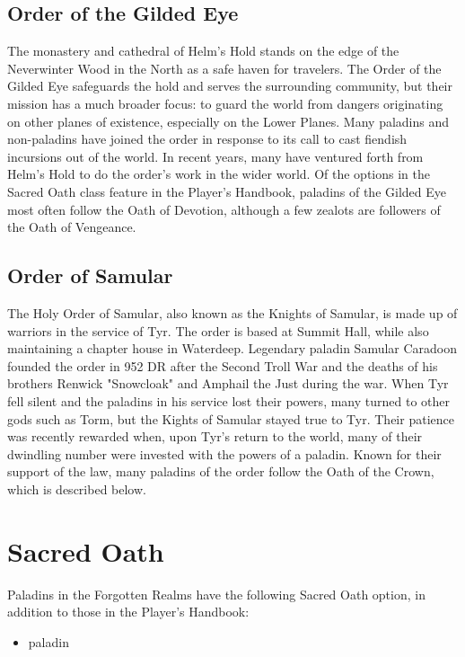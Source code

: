 \documentclass[10pt,a4paper,twoside,twocolumn,openany,bg=print,nodeprecatedcode]{dndbook}
\begin{document}
\subsection{Order of the Gilded Eye}
The monastery and cathedral of Helm's Hold stands on the edge of the Neverwinter Wood in the North as a safe haven for travelers. The Order of the Gilded Eye safeguards the hold and serves the surrounding community, but their mission has a much broader focus: to guard the world from dangers originating on other planes of existence, especially on the Lower Planes. Many paladins and non-paladins have joined the order in response to its call to cast fiendish incursions out of the world. In recent years, many have ventured forth from Helm's Hold to do the order's work in the wider world.
Of the options in the Sacred Oath class feature in the Player's Handbook, paladins of the Gilded Eye most often follow the Oath of Devotion, although a few zealots are followers of the Oath of Vengeance.
\subsection{Order of Samular}
The Holy Order of Samular, also known as the Knights of Samular, is made up of warriors in the service of Tyr. The order is based at Summit Hall, while also maintaining a chapter house in Waterdeep. Legendary paladin Samular Caradoon founded the order in 952 DR after the Second Troll War and the deaths of his brothers Renwick "Snowcloak" and Amphail the Just during the war. When Tyr fell silent and the paladins in his service lost their powers, many turned to other gods such as Torm, but the Kights of Samular stayed true to Tyr. Their patience was recently rewarded when, upon Tyr's return to the world, many of their dwindling number were invested with the powers of a paladin. Known for their support of the law, many paladins of the order follow the Oath of the Crown, which is described below.
\section{Sacred Oath}
Paladins in the Forgotten Realms have the following Sacred Oath option, in addition to those in the Player's Handbook:

\begin{itemize}
\item paladin
\end{itemize}
\end{document}
